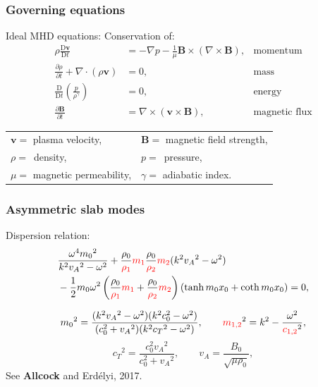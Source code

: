 \documentclass{beamer}
\begin{document}
\begin{frame}
\frametitle{Governing equations}
Ideal MHD equations: \hspace{3.8cm} Conservation of:
\begin{align*}
\rho\frac{\textrm{D}\boldsymbol{v}}{\textrm{D}{t}}&=-\nabla{p}-\frac{1}{\mu}\boldsymbol{B}\times(\nabla\times\boldsymbol{B}), & \text{momentum} \\
\frac{\partial\rho}{\partial{t}}+\nabla\cdot(\rho\boldsymbol{v})&=0, & \text{mass} \\
\frac{\textrm{D}}{\textrm{D}{t}}\left(\frac{p}{\rho^\gamma}\right)&=0, & \text{energy} \\
\frac{\partial{\boldsymbol{B}}}{\partial{t}}&=\nabla\times(\boldsymbol{v}\times\boldsymbol{B}), & \text{magnetic flux} 
\end{align*}

\small
\centering
\vspace{0.7cm}
\begin{tabular}{ll}
$\boldsymbol{v}=$ plasma velocity, & $\boldsymbol{B}=$ magnetic field strength,
\\
$\rho=$~density, & $p=$~pressure,
\\
$\mu=$ magnetic permeability, & $\gamma=$ adiabatic index.
\end{tabular}
\end{frame}


\begin{frame}
\frametitle{Asymmetric slab modes}

\begin{block}{Dispersion relation:}
\vspace{-0.5cm}
\begin{align*}
&\frac{\omega^4{m_0}^2}{k^2{v_A}^2-\omega^2}+\frac{\rho_0}{\textcolor{red}{\rho_1}}\textcolor{red}{m_1}\frac{\rho_0}{\textcolor{red}{\rho_2}}\textcolor{red}{m_2}(k^2{v_A}^2-\omega^2) \\
&-\frac{1}{2}{m_0}\omega^2\left(\frac{\rho_0}{\textcolor{red}{\rho_1}}\textcolor{red}{m_1}+\frac{\rho_0}{\textcolor{red}{\rho_2}}\textcolor{red}{m_2}\right)\left(\tanh{{m_0}x_0}+\coth{{m_0}x_0}\right)=0,
\end{align*}
\end{block}

\scriptsize
\begin{equation*}
{m_0}^2=\frac{(k^2{v_A}^2-\omega^2)(k^2c_0^2-\omega^2)}{(c_0^2+{v_A}^2)(k^2{c_T}^2-\omega^2)}, \qquad
\textcolor{red}{m_{1,2}}^2=k^2-\frac{\omega^2}{\textcolor{red}{c_{1,2}}^2},
\end{equation*}
\begin{equation*}
{c_T}^2=\frac{c_0^2{v_A}^2}{c_0^2+{v_A}^2}, \qquad {v_A}=\frac{{B_0}}{\sqrt{{\mu}\rho_0}},
\end{equation*}
See \textbf{Allcock} and Erd\'{e}lyi, 2017.
\end{frame}
\end{document}
